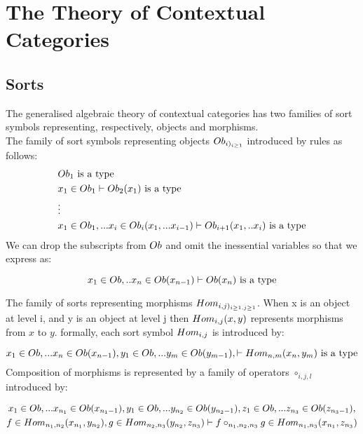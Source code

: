 \documentclass[10pt,a4paper]{article}
\begin{document}
\section{The Theory of Contextual Categories}

\subsection*{Sorts}
The generalised algebraic theory of contextual categories has two families of sort symbols representing, respectively,  objects and morphisms. \\

\noindent The family of sort symbols representing objects $Ob_{i)_{i\geq 1}}$ introduced by 
rules as follows: 
\begin{align*}
&Ob_1\mbox{ is a type} \\
&x_1 \in Ob_1 \vdash Ob_2(x_1)\mbox{ is a type} \\
& \vdots \\
&x_1 \in Ob_1,... x_{i} \in Ob_{i}(x_1,...x_{i-1}) \vdash Ob_{i+1}(x_1, ..x_{i})\mbox{ is a type} \\
\end{align*}
\noindent We can drop the subscripts from $Ob$ and omit the inessential variables so that we express as:

\begin{equation}
x_1 \in Ob,.. x_{n} \in Ob(x_{n-1}) \vdash Ob(x_{n})\mbox{ is a type} \\
\end{equation}
\vspace{0cm}

\noindent The family of sorts representing morphisms
$Hom_{i,j)_{i\geq 1,j\geq1}}$. 
When x is an object at level i, and y is an object at level j then $Hom_{i,j}(x,y)$ represents morphisms from $x$ to $y$. 
formally, each sort symbol $Hom_{i,j}$ is introduced by:

\begin{equation}
\label{sortintroterm}
x_1 \in Ob,... x_{n} \in Ob(x_{n-1}), y_1 \in Ob,... y_{m} \in Ob(y_{m-1}),
\vdash Hom_{n,m}(x_n,y_m)\mbox{ is a type}
 \\
\end{equation}
\noindent Composition of morphisms is represented by a family of operators $\circ_{i,j,l}$ introduced by:

\begin{multline}
\label{compositionintro}
x_1 \in Ob,... x_{{n_1}} \in Ob(x_{{n_1}-1}), y_1 \in Ob,... y_{{n_2}} \in Ob(y_{{n_2}-1}),z_1 \in Ob,... z_{{n_3}} \in Ob(z_{{n_3}-1}), \\
f \in Hom_{{n_1},{n_2}}(x_{n_1},y_{n_2}), g \in Hom_{{n_2},{n_3}}(y_{n_2},z_{n_3})
\vdash f \circ_{{n_1},{n_2},{n_3}} g \in Hom_{{n_1},{n_3}}(x_{n_1},z_{n_3})
\end{multline}
\end{document}

